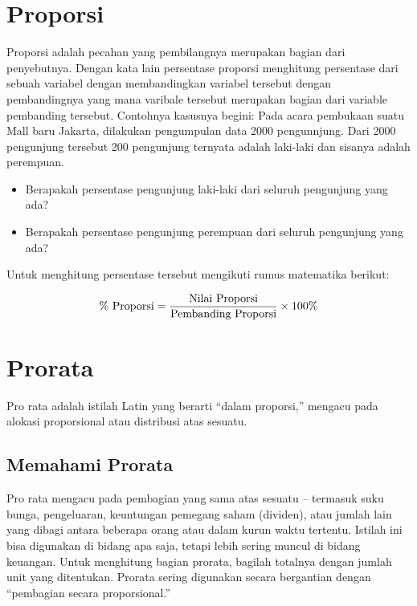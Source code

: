 \documentclass[
]{book}
\providecommand{\tightlist}{%
  \setlength{\itemsep}{0pt}\setlength{\parskip}{0pt}}
\begin{document}
\hypertarget{proporsi}{%
\section{Proporsi}\label{proporsi}}

Proporsi adalah pecahan yang pembilangnya merupakan bagian dari penyebutnya. Dengan kata lain persentase proporsi menghitung persentase dari sebuah variabel dengan membandingkan variabel tersebut dengan pembandingnya yang mana varibale tersebut merupakan bagian dari variable pembanding tersebut. Contohnya kasusnya begini: Pada acara pembukaan suatu Mall baru Jakarta, dilakukan pengumpulan data 2000 pengunnjung. Dari 2000 pengunjung tersebut 200 pengunjung ternyata adalah laki-laki dan sisanya adalah perempuan.

\begin{itemize}
\tightlist
\item
  Berapakah persentase pengunjung laki-laki dari seluruh pengunjung yang ada?
\item
  Berapakah persentase pengunjung perempuan dari seluruh pengunjung yang ada?
\end{itemize}

Untuk menghitung persentase tersebut mengikuti rumus matematika berikut:

\[ \% \text{ Proporsi}  = {\text{Nilai Proporsi} \over \text{Pembanding Proporsi}} \times 100 \%\]

\hypertarget{prorata}{%
\section{Prorata}\label{prorata}}

Pro rata adalah istilah Latin yang berarti ``dalam proporsi,'' mengacu pada alokasi proporsional atau distribusi atas sesuatu.

\hypertarget{memahami-prorata}{%
\subsection{Memahami Prorata}\label{memahami-prorata}}

Pro rata mengacu pada pembagian yang sama atas sesuatu -- termasuk suku bunga, pengeluaran, keuntungan pemegang saham (dividen), atau jumlah lain yang dibagi antara beberapa orang atau dalam kurun waktu tertentu. Istilah ini bisa digunakan di bidang apa saja, tetapi lebih sering muncul di bidang keuangan. Untuk menghitung bagian prorata, bagilah totalnya dengan jumlah unit yang ditentukan. Prorata sering digunakan secara bergantian dengan ``pembagian secara proporsional.''
\end{document}
